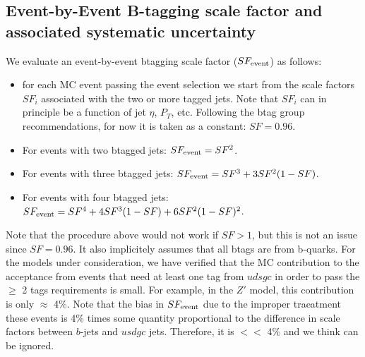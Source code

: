 \subsection{Event-by-Event B-tagging scale factor and associated systematic uncertainty}
We evaluate an event-by-event btagging scale factor ($SF_{\rm event}$) as follows:

\begin{itemize}
\item for each MC event passing the event selection we start
from the scale factors $SF_i$ associated with the two or more
tagged jets.  Note that $SF_i$ can in principle be a function 
of jet $\eta$, $P_T$, etc.  Following the btag group recommendations,
for now it is taken as a constant: $SF=0.96$.

\item For events with two btagged jets: $SF_{\rm event}=SF^2$.

\item For events with three btagged jets: $SF_{\rm event}=SF^3 + 3SF^2(1-SF)$.

\item For events with four btagged jets: $SF_{\rm event}=SF^4 + 4SF^3(1-SF) + 6SF^2(1-SF)^2$.
\end{itemize}

Note that the procedure above would not work if $SF>1$, but this is not an issue
since $SF=0.96$.
It also implicitely assumes that all btags are from b-quarks.  For the models under 
consideration, we have verified that the MC contribution to the acceptance from 
events that need at least one tag from $udsgc$ in order to pass the $\ge$ 2 tags 
requirements is small.  For example, in the $Z'$ model, this contribution is
only $\approx$ 4\%.  Note that the bias in $SF_{\rm event}$ due to the improper traeatment
these events is 4\% times some quantity proportional to the difference in scale 
factors between $b$-jets and $usdgc$ jets.  Therefore, it is $<<$ 4\% and we think
can be ignored.  


